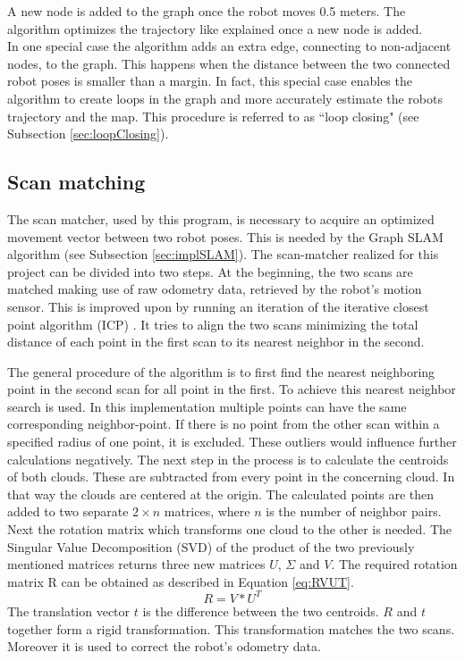 \documentclass{ba-kecs}
\begin{document}
A new node is added to the graph once the robot moves 0.5 meters. The algorithm optimizes the trajectory like explained once a new node is added.\\
In one special case the algorithm adds an extra edge, connecting to non-adjacent nodes, to the graph. This happens when the distance between the two connected robot poses is smaller than a margin. In fact, this special case enables the algorithm to create loops in the graph and more accurately estimate the robots trajectory and the map. This procedure is referred to as ``loop closing" (see Subsection \ref{sec:loopClosing}). 
\subsection{Scan matching}
\label{sec:scan}
The scan matcher, used by this program, is necessary to acquire an optimized movement vector between two robot poses. This is needed by the Graph SLAM algorithm (see Subsection \ref{sec:implSLAM}). The scan-matcher realized for this project can be divided into two steps. At the beginning, the two scans are matched making use of raw odometry data, retrieved by the robot's motion sensor. This is improved upon by running an iteration of the iterative closest point algorithm (ICP) \citep{scanmatch}. It tries to align the two scans minimizing the total distance of each point in the first scan to its nearest neighbor in the second. 

The general procedure of the algorithm \citep{scanmatch} is to first find the nearest neighboring point in the second scan for all point in the first. To achieve this nearest neighbor search is used.
In this implementation multiple points can have the same corresponding neighbor-point. If there is no point from the other scan within a specified radius of one point, it is excluded. These outliers would influence further calculations negatively.
The next step in the process is to calculate the centroids of both clouds. These are subtracted from every point in the concerning cloud. In that way the clouds are centered at the origin. The calculated points are then added to two separate $2 \times n$ matrices, where $n$ is the number of neighbor pairs. Next the rotation matrix which transforms one cloud to the other is needed. The Singular Value Decomposition (SVD) of the product of the two previously mentioned matrices returns three new matrices $U$, $\Sigma$ and $V$. The required rotation matrix R can be obtained as described in Equation \ref{eq:RVUT}.
\begin{equation}
\label{eq:RVUT}
 R = V * U^T
\end{equation}
The translation vector $t$ is the difference between the two centroids. $R$ and $t$ together form a rigid transformation. This transformation matches the two scans. Moreover it is used to correct the robot's odometry data.
\end{document}
